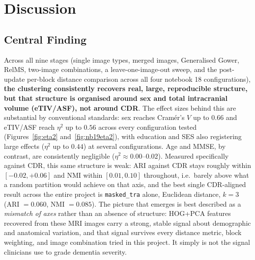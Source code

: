 \documentclass[11pt, a4paper]{article}
\begin{document}
\section{Discussion}
\label{sec:discussion}

\subsection{Central Finding}
Across all nine stages (single image types, merged images, Generalised Gower, RelMS, two-image
combinations, a leave-one-image-out sweep, and the post-update per-block distance comparison across
all four notebook 18 configurations), \textbf{the clustering consistently recovers real, large,
reproducible structure, but that structure is organised around sex and total intracranial volume
(eTIV/ASF), not around CDR}. The effect sizes behind this are substantial by conventional standards:
sex reaches Cram\'er's $V$ up to $0.66$ and eTIV/ASF reach $\eta^2$ up to $0.56$ across every
configuration tested (Figures~\ref{fig:eta2} and~\ref{fig:nb19eta2}), with education and SES also
registering large effects ($\eta^2$ up to $0.44$) at several configurations. Age and MMSE, by
contrast, are consistently negligible ($\eta^2\approx0.00$--$0.02$). Measured specifically against
CDR, this same structure is weak: ARI against CDR stays roughly within $[-0.02, +0.06]$ and NMI
within $[0.01, 0.10]$ throughout, i.e.\ barely above what a random partition would achieve on that
axis, and the best single CDR-aligned result across the entire project is \texttt{masked\_tra} alone,
Euclidean distance, $k=3$ (ARI $=0.060$, NMI $=0.085$). The picture that emerges is best described
as a \emph{mismatch of axes} rather than an absence of structure: HOG+PCA features recovered from
these MRI images carry a strong, stable signal about demographic and anatomical variation, and that
signal survives every distance metric, block weighting, and image combination tried in this project.
It simply is not the signal clinicians use to grade dementia severity.
\end{document}
